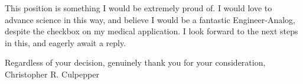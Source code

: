 \documentclass[line]{res}
\begin{document}
\begin{resume}
This position is something I would be extremely proud of. I would love to advance 
science in this way, and believe I would be a fantastic Engineer-Analog, despite the 
checkbox on my medical application. I look forward to the next steps in this, and eagerly await a reply. 

\noindent Regardless of your decision, genuinely thank you for your consideration,
\\
Christopher R. Culpepper
\end{resume}
\end{document}

